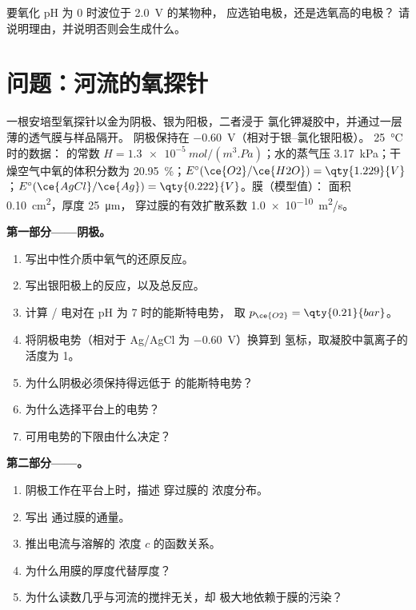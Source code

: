 \begin{exercise}[$\star\star\star$]\label{exo:b2:current-potential-curves:12}
要氧化 pH 为 0 时波位于 \qty{2.0}{V} 的某物种，
应选铂电极，还是选氧高的电极？
请说明理由，并说明否则会生成什么。
\end{exercise}

\section{问题：河流的氧探针}

\begin{problem}
\label{pb:b2:current-potential-curves:1}
一根安培型氧探针以金为阴极、银为阳极，二者浸于
氯化钾凝胶中，并通过一层薄的透气膜与样品隔开。
阴极保持在 \qty{-0.60}{V}（相对于银–氯化银阳极）。
\qty{25}{\degreeCelsius} 时的数据： 的常数
$H = \qty{1.3e-5}{mol/(m^3.Pa)}$；水的蒸气压
\qty{3.17}{kPa}；干燥空气中氧的体积分数为 20.95~\%；$E^\circ(\ce{O2}/\ce{H2O}) =
\qty{1.229}{V}$；$E^\circ(\ce{AgCl}/\ce{Ag}) = \qty{0.222}{V}$。膜（模型值）：
面积 \qty{0.10}{cm^2}，厚度 \qty{25}{\micro m}，
 穿过膜的有效扩散系数 \qty{1.0e-10}{m^2/s}。

\medskip
\noindent\textbf{第一部分——阴极。}
\begin{enumerate}
  \item 写出中性介质中氧气的还原反应。
  \item 写出银阳极上的反应，以及总反应。
  \item 计算 / 电对在 pH 为 7 时的能斯特电势，
        取 $p_{\ce{O2}} = \qty{0.21}{bar}$。
  \item 将阴极电势（相对于 Ag/AgCl 为 \qty{-0.60}{V}）换算到
        氢标，取凝胶中氯离子的活度为 1。
  \item 为什么阴极必须保持得远低于
         的能斯特电势？
  \item 为什么选择平台上的电势？
  \item 可用电势的下限由什么决定？
\end{enumerate}

\medskip
\noindent\textbf{第二部分——。}
\begin{enumerate}[resume]
  \item 阴极工作在平台上时，描述  穿过膜的
        浓度分布。
  \item 写出  通过膜的通量。
  \item 推出电流与溶解的
         浓度 $c$ 的函数关系。
  \item 为什么用膜的厚度代替厚度？
  \item 为什么读数几乎与河流的搅拌无关，却
        极大地依赖于膜的污染？
\end{enumerate}


\end{problem}

